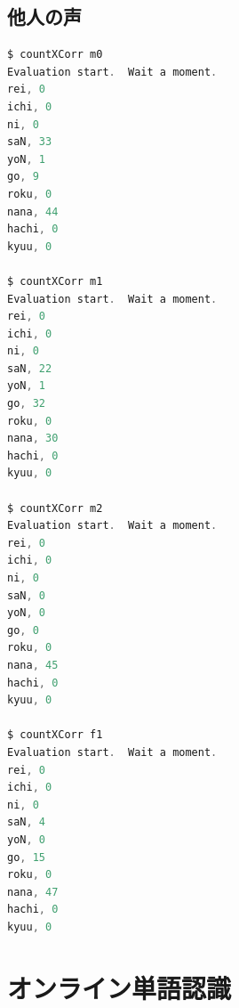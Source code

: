 \documentclass[11pt,a4paper, uplatex]{jsarticle}
\begin{document}
\subsection{他人の声}
\begin{lstlisting}[language=c, caption=\texttt{countXCorr}実行結果]
$ countXCorr m0
Evaluation start.  Wait a moment.
rei, 0
ichi, 0
ni, 0
saN, 33
yoN, 1
go, 9
roku, 0
nana, 44
hachi, 0
kyuu, 0

$ countXCorr m1
Evaluation start.  Wait a moment.
rei, 0
ichi, 0
ni, 0
saN, 22
yoN, 1
go, 32
roku, 0
nana, 30
hachi, 0
kyuu, 0

$ countXCorr m2
Evaluation start.  Wait a moment.
rei, 0
ichi, 0
ni, 0
saN, 0
yoN, 0
go, 0
roku, 0
nana, 45
hachi, 0
kyuu, 0

$ countXCorr f1
Evaluation start.  Wait a moment.
rei, 0
ichi, 0
ni, 0
saN, 4
yoN, 0
go, 15
roku, 0
nana, 47
hachi, 0
kyuu, 0

\end{lstlisting}

\section{オンライン単語認識}
\end{document}
